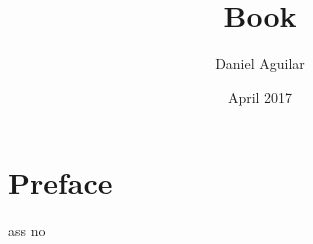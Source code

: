 
\title{Book}
\newpage
\author{Daniel Aguilar}
\date{April 2017}
\makeindex

\frontmatter
\begin{titlepage}
\end{titlepage}
\null
\pagestyle{empty} %

\maketitle
\tableofcontents

\mainmatter


\chapter{Preface}
ass  no
\cleardoublepage
\printindex
